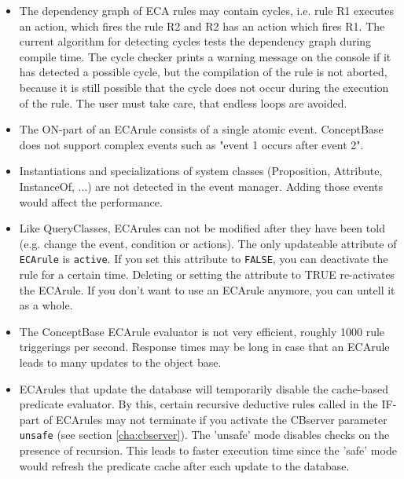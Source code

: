 \begin{itemize}
\item The dependency graph of ECA rules may contain cycles, i.e.
rule R1 executes an action, which fires the rule R2 and R2
has an action which fires R1. The current algorithm for detecting
cycles tests the dependency graph during compile time.
The cycle checker prints a warning message on the
console if it has detected a possible cycle, but the compilation
of the rule is not aborted, because it is still possible that the cycle
does not occur during the execution of the rule. The user must
take care, that endless loops are avoided.

\item The ON-part of an ECArule consists of a single atomic event.
ConceptBase does not support complex events such as "event 1 occurs after
event 2". 

\item Instantiations and specializations of system classes (Proposition,
Attribute, InstanceOf, ...) are not detected in the event manager.
Adding those events would affect the performance.

\item Like QueryClasses, ECArules can not be modified after they have
been told (e.g. change the event, condition or actions).
The only updateable attribute of {\tt ECArule} is {\tt active}.
If you set this attribute to {\tt FALSE}, you can deactivate
the rule for a certain time. Deleting or setting the attribute
to TRUE re-activates the ECArule. If you don't want to use an ECArule
anymore, you can untell it as a whole.

\item The ConceptBase ECArule evaluator is not very efficient, roughly 1000 rule triggerings
per second. Response times may be long in case that an ECArule leads to many updates to the object base.

\item ECArules that update the database will temporarily disable the
cache-based predicate evaluator. By this, certain recursive deductive rules called
in the IF-part of ECArules may not terminate if you activate the CBserver
parameter {\tt unsafe} (see section \ref{cha:cbserver}). The 'unsafe' mode
disables checks on the presence of recursion. This leads to faster 
execution time since the 'safe' mode would refresh the predicate cache after
each update to the database. 


\end{itemize}

